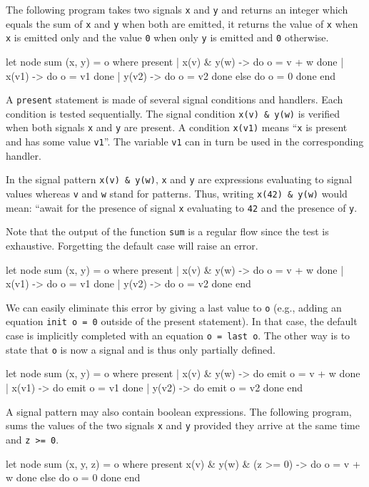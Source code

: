 \documentclass[11pt,titlepage,twoside]{report}
\begin{document}
The following program takes two signals \verb-x- and \verb-y- and
returns an integer which equals the sum of \verb-x- and \verb-y- when
both are emitted, it returns the value of \verb-x- when \verb-x- is
emitted only and the value \verb-0- when only \verb-y- is emitted and
\verb-0- otherwise.
\begin{chklisting}[withresult]
let node sum (x, y) = o where
  present
  | x(v) & y(w) -> do o = v + w done
  | x(v1) -> do o = v1 done
  | y(v2) -> do o = v2 done
  else do o = 0 done
  end
\end{chklisting}
A \verb-present- statement is made of several signal conditions and
handlers. Each condition is tested sequentially. The signal condition
\verb-x(v) & y(w)- is verified when both signals \verb-x- and \verb-y-
are present. A condition \verb-x(v1)- means ``\verb-x- is present and
has some value \verb-v1-''. The variable \verb-v1- can in turn be used
in the corresponding handler.

In the signal pattern \verb-x(v) & y(w)-, \verb-x- and \verb-y- are
expressions evaluating to signal values whereas \verb-v- and \verb-w-
stand for patterns. Thus, writing \verb-x(42) & y(w)- would mean:
``await for the presence of signal \verb-x- evaluating to \verb-42-
and the presence of \verb-y-.

Note that the output of the function \verb-sum- is a regular flow
since the test is exhaustive. Forgetting the default case will raise
an error.
\begin{chklisting}
let node sum (x, y) = o where
  present
  | x(v) & y(w) -> do o = v + w done
  | x(v1) -> do o = v1 done
  | y(v2) -> do o = v2 done
  end
\end{chklisting}

We can easily eliminate this error by giving a last value to \verb-o-
(e.g., adding an equation \verb-init o = 0- outside of the present
statement). In that case, the default case is implicitly completed
with an equation \verb-o = last o-. The other way is to state that
\verb-o- is now a signal and is thus only partially defined.
\begin{chklisting}[withresult]
let node sum (x, y) = o where
  present
  | x(v) & y(w) -> do emit o = v + w done
  | x(v1) -> do emit o = v1 done
  | y(v2) -> do emit o = v2 done
  end
\end{chklisting}

A signal pattern may also contain boolean expressions. The following
program, sums the values of the two signals \verb-x- and \verb-y-
provided they arrive at the same time and \verb-z >= 0-.
\begin{chklisting}
let node sum (x, y, z) = o where
  present
    x(v) & y(w) & (z >= 0) -> do o = v + w done
  else do o = 0 done
  end
\end{chklisting}
\end{document}
